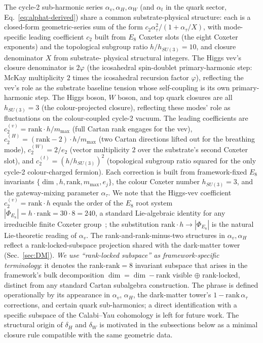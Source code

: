 ﻿\documentclass[reprint,amsmath,amssymb,aps,prd,longbibliography,floatfix]{revtex4-2}
\begin{document}
The cycle-2 sub-harmonic series $\alpha_v, \alpha_H, \alpha_W$ (and
$\alpha_t$ in the quark sector, Eq.~\eqref{eq:alphat-derived}) share
a common substrate-physical structure: each is a closed-form
geometric-series sum of the form $c_2 \alpha_\tau^2 / (1 + \alpha_\tau/X)$,
with mode-specific leading coefficient $c_2$ built from $E_8$ Coxeter
slots (the eight Coxeter exponents) and the topological subgroup
ratio $h/h_{SU(3)} = 10$, and closure denominator $X$ from substrate-
physical structural integers. The Higgs vev's closure denominator is
$2\varphi$ (the icosahedral spin-doublet primary-harmonic step:
McKay multiplicity $2$ times the icosahedral recursion factor
$\varphi$), reflecting the vev's role as the substrate baseline tension
whose self-coupling is its own primary-harmonic step. The Higgs
boson, $W$ boson, and top quark closures are all $h_{SU(3)} = 3$ (the
colour-projected closure), reflecting these modes' role as
fluctuations on the colour-coupled cycle-2 vacuum. The leading
coefficients are $c_2^{(v)} = \text{rank} \cdot h / m_{\max}$ (full
Cartan rank engages for the vev), $c_2^{(H)} = (\text{rank}-2) \cdot h
/ m_{\max}$ (two Cartan directions lifted out for the breathing
mode), $c_2^{(W)} = 2/e_2$ (vector multiplicity $2$ over the
substrate's second Coxeter slot), and $c_2^{(t)} = (h/h_{SU(3)})^2$
(topological subgroup ratio squared for the only cycle-2
colour-charged fermion). Each
correction is built from framework-fixed $E_8$ invariants
$\{\dim, h, \text{rank}, m_{\max}, e_j\}$, the colour Coxeter number
$h_{SU(3)} = 3$, and the gateway-mixing parameter $\alpha_\tau$. We note that the Higgs-vev coefficient
$c_2^{(v)} = \text{rank} \cdot h$ equals the order of the $E_8$
root system $|\Phi_{E_8}| = h \cdot \text{rank} = 30 \cdot 8 = 240$,
a standard Lie-algebraic identity for any irreducible finite
Coxeter group~\cite{Humphreys1990}; the substitution
$\text{rank} \cdot h \to |\Phi_{E_8}|$ is the natural Lie-theoretic
reading of $\alpha_v$. The rank-and-rank-minus-two structures in
$\alpha_v, \alpha_H$ reflect a rank-locked-subspace projection
shared with the dark-matter tower (Sec.~\ref{sec:DM}). \emph{We use
``rank-locked subspace'' as framework-specific terminology}: it
denotes the rank-$\text{rank} = 8$ invariant subspace that arises in
the framework's bulk decomposition $\dim = \dim - \text{rank}$ visible
$\oplus$ rank-locked, distinct from any standard Cartan subalgebra
construction. The phrase is defined operationally by its appearance
in $\alpha_v$, $\alpha_H$, the dark-matter tower's
$1 - \text{rank}\,\alpha_\tau$ corrections, and certain quark
sub-harmonics; a direct identification with a specific subspace of
the Calabi--Yau cohomology is left for future work. The
structural origin of $\delta_H$ and $\delta_W$ is motivated in the
subsections below as a minimal closure rule compatible with the same
geometric data.
\end{document}
